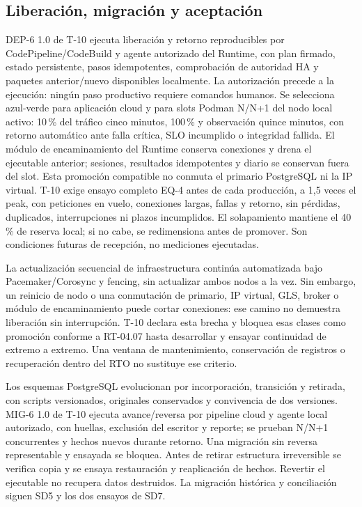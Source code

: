 \subsection{Liberación, migración y aceptación}
DEP-6 1.0 de T-10 ejecuta liberación y retorno reproducibles por CodePipeline/CodeBuild y agente autorizado del Runtime, con plan firmado, estado persistente, pasos idempotentes, comprobación de autoridad HA y paquetes anterior/nuevo disponibles localmente. La autorización precede a la ejecución: ningún paso productivo requiere comandos humanos. Se selecciona azul-verde para aplicación cloud y para slots Podman N/N+1 del nodo local activo: 10\,\% del tráfico cinco minutos, 100\,\% y observación quince minutos, con retorno automático ante falla crítica, SLO incumplido o integridad fallida. El módulo de encaminamiento del Runtime conserva conexiones y drena el ejecutable anterior; sesiones, resultados idempotentes y diario se conservan fuera del slot. Esta promoción compatible no conmuta el primario PostgreSQL ni la IP virtual. T-10 exige ensayo completo EQ-4 antes de cada producción, a 1,5 veces el peak, con peticiones en vuelo, conexiones largas, fallas y retorno, sin pérdidas, duplicados, interrupciones ni plazos incumplidos. El solapamiento mantiene el 40\,\% de reserva local; si no cabe, se redimensiona antes de promover. Son condiciones futuras de recepción, no mediciones ejecutadas. \parencite[RT-04.06/07, p.~11]{sd6-bt}

La actualización secuencial de infraestructura continúa automatizada bajo Pacemaker/Corosync y fencing, sin actualizar ambos nodos a la vez. Sin embargo, un reinicio de nodo o una conmutación de primario, IP virtual, GLS, broker o módulo de encaminamiento puede cortar conexiones: ese camino no demuestra liberación sin interrupción. T-10 declara esta brecha y bloquea esas clases como promoción conforme a RT-04.07 hasta desarrollar y ensayar continuidad de extremo a extremo. Una ventana de mantenimiento, conservación de registros o recuperación dentro del RTO no sustituye ese criterio. \parencite[art.~20, pp.~14--15]{sd6-ba}

Los esquemas PostgreSQL evolucionan por incorporación, transición y retirada, con scripts versionados, originales conservados y convivencia de dos versiones. MIG-6 1.0 de T-10 ejecuta avance/reversa por pipeline cloud y agente local autorizado, con huellas, exclusión del escritor y reporte; se prueban N/N+1 concurrentes y hechos nuevos durante retorno. Una migración sin reversa representable y ensayada se bloquea. Antes de retirar estructura irreversible se verifica copia y se ensaya restauración y reaplicación de hechos. Revertir el ejecutable no recupera datos destruidos. La migración histórica y conciliación siguen SD5 y los dos ensayos de SD7. \parencite[RT-04.10, p.~11; cap.~20, pp.~34--35]{sd6-bt}

